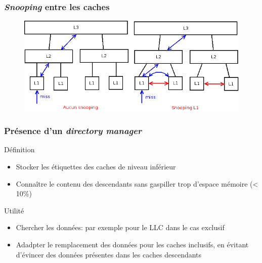 \begin{frame}
  \frametitle{\emph{Snooping} entre les caches}
  
  \begin{figure}[h!]
    \includegraphics[width=.8\textwidth]{images/DiagrammeSnooping.png}
  \end{figure}  
  
\end{frame}


\begin{frame}
  \frametitle{Présence d'un \emph{directory manager}}
\begin{block}{Définition}
  \begin{itemize}
  \item Stocker les étiquettes des caches de niveau inférieur
  \item Connaître le contenu des descendants sans gaspiller trop d'espace mémoire (< 10\%)
  \end{itemize}
\end{block}

\begin{block}{Utilité}
\begin{itemize}
\item Chercher les données: par exemple pour le LLC dans le cas exclusif
\item Adadpter le remplacement des données pour les caches inclusifs, en évitant d'évincer des données présentes dans les caches descendants
\end{itemize}
\end{block}  
\end{frame}
